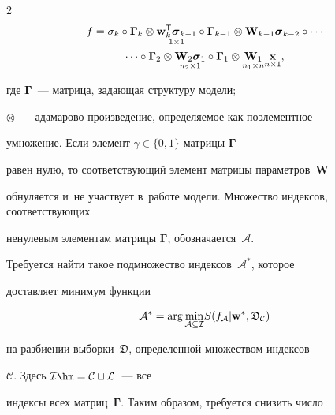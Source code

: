 \begin{multicols}{2}
\begin{multline}


\label{eq57}


f = 


\sigma_k\circ\boldsymbol{\Gamma}_k\otimes\underset{1\times1}{\wm_k^\mathsf{T}


\sigmab_{k-1}}\circ\boldsymbol{\Gamma}_{k-1}\otimes\mathbf{W}_{k-


1}\sigmab_{k-2}\circ\cdots\\


\cdots\circ\boldsymbol{\Gamma}_2\otimes\underset{n_2 


\times 


1}{\mathbf{W}_2\sigmab_1}\circ\boldsymbol{\Gamma}_1\otimes\underset{n_1 


\times n}{\mathbf{W}_1}\underset{n \times 1}{\x},


\end{multline}


где $\boldsymbol{\Gamma}$~--- матрица, за\-да\-ющая структуру модели; 


$\otimes$~--- адамарово произведение, определяемое как поэлементное 


умножение. Если элемент $\gamma\in\{0,1\}$ мат\-ри\-цы $\boldsymbol{\Gamma}$ 


равен нулю, то соответствующий элемент мат\-ри\-цы па\-ра\-мет\-ров~$\mathbf{W}$ 


обнуляется и~не участвует в~работе модели. Множество индексов, соответствующих 


ненулевым элементам матрицы $\boldsymbol{\Gamma}$, обозначается~$\mathcal{A}$.  


Требуется найти такое подмножество индексов~$\mathcal{A}^{*}$, которое 


доставляет минимум \mbox{функции}


\begin{equation}


\label{eq46}


\mathcal{A}^{*} = \mathrm{arg}\,\underset{\mathcal{A} \subseteq 


\mathcal{I}}\min S(f_{\mathcal{A}}|\wm^*, \mathfrak{D}_\mathcal{C})


\end{equation}


на разбиении выборки~$\mathfrak{D}$, определенной множеством индексов 


$\mathcal{C}$. Здесь $\mathcal{I}\hm = \mathcal{C}\sqcup \mathcal{L}$~--- все 


индексы всех матриц~$\boldsymbol{\Gamma}$. Таким образом, требуется снизить число 



\end{multicols}

